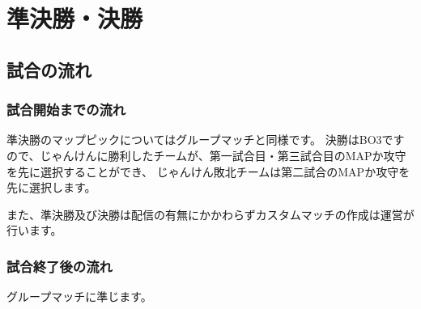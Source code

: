 \documentclass[uplatex,dvipdfmx]{jsarticle}
\begin{document}
\section{準決勝・決勝}
	\subsection{試合の流れ}
	    \subsubsection{試合開始までの流れ}
	        準決勝のマップピックについてはグループマッチと同様です。
	        決勝はBO3ですので、じゃんけんに勝利したチームが、第一試合目・第三試合目のMAPか攻守を先に選択することができ、
	        じゃんけん敗北チームは第二試合のMAPか攻守を先に選択します。

	        また、準決勝及び決勝は配信の有無にかかわらずカスタムマッチの作成は運営が行います。

	    \subsubsection{試合終了後の流れ}
	        グループマッチに準じます。
\end{document}
